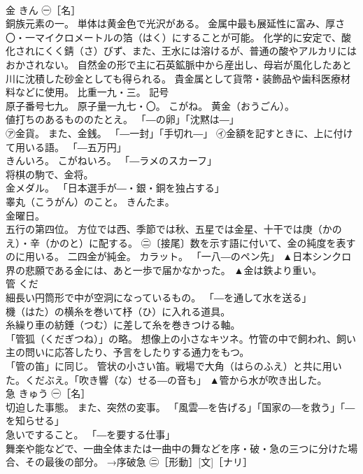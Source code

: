 \documentclass[8pt]{extreport}
\begin{document}
\begin{CJK}{UTF8}{min}
\\	金	きん	㊀［名］ 
\\	銅族元素の一。 単体は黄金色で光沢がある。 金属中最も展延性に富み、厚さ〇・一マイクロメートルの箔（はく）にすることが可能。 化学的に安定で、酸化されにくく錆（さ）びず、また、王水には溶けるが、普通の酸やアルカリにはおかされない。 自然金の形で主に石英鉱脈中から産出し、母岩が風化したあと川に沈積した砂金としても得られる。 貴金属として貨幣・装飾品や歯科医療材料などに使用。 比重一九・三。 記号
\\	原子番号七九。 原子量一九七・〇。 こがね。 黄金（おうごん）。 
\\	値打ちのあるもののたとえ。 「―の卵」「沈黙は―」 
\\	㋐金貨。 また、金銭。 「―一封」「手切れ―」 ㋑金額を記すときに、上に付けて用いる語。 「―五万円」 
\\	きんいろ。 こがねいろ。 「―ラメのスカーフ」 
\\	将棋の駒で、金将。 
\\	金メダル。 「日本選手が―・銀・銅を独占する」 
\\	睾丸（こうがん）のこと。 きんたま。 
\\	金曜日。 
\\	五行の第四位。 方位では西、季節では秋、五星では金星、十干では庚（かのえ）・辛（かのと）に配する。 ㊁〔接尾〕数を示す語に付いて、金の純度を表すのに用いる。 二四金が純金。 カラット。 「一八―のペン先」	▲日本シンクロ界の悲願である金には、あと一歩で届かなかった。 ▲金は鉄より重い。
\\	管	くだ	
\\	細長い円筒形で中が空洞になっているもの。 「―を通して水を送る」 
\\	機（はた）の横糸を巻いて杼（ひ）に入れる道具。 
\\	糸繰り車の紡錘（つむ）に差して糸を巻きつける軸。 
\\	「管狐（くだぎつね）」の略。 想像上の小さなキツネ。竹管の中で飼われ、飼い主の問いに応答したり、予言をしたりする通力をもつ。 
\\	「管の笛」に同じ。 管状の小さい笛。戦場で大角（はらのふえ）と共に用いた。くだぶえ。「吹き響（な）せる―の音も」	▲管から水が吹き出した。
\\	急	きゅう	㊀［名］ 
\\	切迫した事態。 また、突然の変事。 「風雲―を告げる」「国家の―を救う」「―を知らせる」 
\\	急いですること。 「―を要する仕事」 
\\	舞楽や能などで、一曲全体または一曲中の舞などを序・破・急の三つに分けた場合、その最後の部分。 →序破急 ㊁［形動］[文]［ナリ］ 

\end{CJK}
\end{document}

